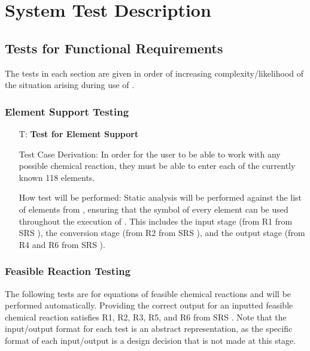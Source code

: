 \documentclass[12pt, titlepage]{article}
\newcounter{testnum} %
\begin{document}

\section{System Test Description}

\subsection{Tests for Functional Requirements} \label{sec_sysFunReqs}

The tests in each section are given in order of increasing
complexity/likelihood of the situation arising during use of \progname{}.

\subsubsection{Element Support Testing}

\begin{enumerate}

  \item[T\refstepcounter{testnum}\thetestnum \label{test_element_support}:]
    \textbf{Test for Element Support}

    Test Case Derivation: In order for the user to be able to work with any
    possible chemical reaction, they must be able to enter each of the
    currently known 118 elements.

    How test will be performed: Static analysis will be performed against the
    list of elements from \cite{helmenstine_list_2020}, ensuring that the
    symbol of every element can be used throughout the execution of
    \progname{}. This includes the input stage (from R1 from SRS ), the conversion stage (from R2 from SRS ), and the
    output stage (from R4 and R6 from SRS ).

\end{enumerate}

\subsubsection{Feasible Reaction Testing}

The following tests are for equations of feasible chemical reactions and
will be performed automatically. Providing the correct output for an inputted
feasible chemical reaction satisfies R1, R2, R3, R5, and R6 from SRS . Note that the input/output format
for each test is an abstract representation, as the specific format of each
input/output is a design decision that is not made at this stage.
\end{document}

